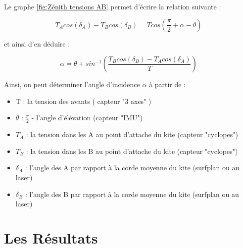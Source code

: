 \documentclass[conference]{IEEEtran}
\begin{document}
Le graphe \ref{fig:Zénith tensions AB} permet d'écrire la relation suivante : 
\begin{center}
    \begin{equation}
        T_A cos(\delta_A) - T_B cos(\delta_B) = T cos(\frac{\pi}{2} +\alpha - \theta)
    \end{equation}
\end{center}

et ainsi d'en déduire :

\begin{center}
    \begin{equation}
        \alpha = \theta + sin^{-1}(\frac{T_B cos(\delta_B) - T_A cos(\delta_A)}{T})
    \end{equation}
\end{center}

Ainsi, on peut déterminer l'angle d'incidence $\alpha$ à partir de :
\begin{itemize}
    \item T : la tension des avants ( capteur "3 axes" )
    \item $\theta$ : $\frac{\pi}{2}$ - l'angle d'élévation (capteur "IMU")
    \item $T_A$ : la tension dans les A au point d'attache du kite (capteur "cyclopes")
    \item $T_B$ : la tension dans les B au point d'attache du kite (capteur "cyclopes")
    \item $\delta_A$ : l'angle des A par rapport à la corde moyenne du kite (surfplan ou au laser)
    \item $\delta_B$ : l'angle des B par rapport à la corde moyenne du kite (surfplan ou au laser)
\end{itemize}

\IEEEpeerreviewmaketitle
\section{Les Résultats}
\end{document}

